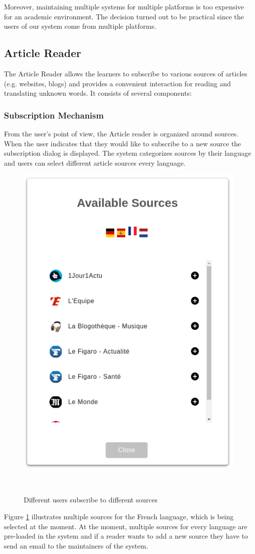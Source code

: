 Moreover, maintaining multiple systems for multiple platforms is too expensive for an academic environment. The decision turned out to be practical since the users of our system come from multiple platforms.

\newpage
\subsection{Article Reader}

The Article Reader allows the learners to subscribe to various sources of articles (e.g. websites, blogs) and provides a convenient interaction for reading and translating unknown words. It consists of several components:

\subsubsection{Subscription Mechanism}
From the user's point of view, the Article reader is organized around sources. When the user indicates that they would like to subscribe to a new source the subscription dialog is displayed. The system categorizes sources by their language and users can select different article sources every language. 

    \begin{figure}[h!]
    \centering
      \includegraphics[width=0.4\columnwidth]{figures/available_sources}
      \caption{Different users subscribe to different sources}~\label{fig:system_subscriptions}
    \end{figure}


Figure \ref{fig:system_subscriptions} illustrates multiple sources for the French language, which is being selected at the moment. 
At the moment, multiple sources for every language are pre-loaded in the system and if a reader wants to add a new source they have to send an email to the maintainers of the system. 

